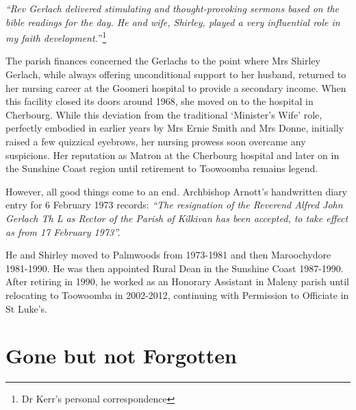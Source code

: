\emph{``Rev Gerlach delivered stimulating and thought-provoking sermons based on the bible readings for the day. He and wife, Shirley, played a very influential role in my faith development.}''\footnote{Dr Kerr's personal correspondence}


The parish finances concerned the Gerlachs to the point where Mrs Shirley Gerlach, while always offering unconditional support to her husband, returned to her nursing career at the Goomeri hospital to provide a secondary income. When this facility closed its doors around 1968, she moved on to the hospital in Cherbourg. While this deviation from the traditional `Minister's Wife' role, perfectly embodied in earlier years by Mrs Ernie Smith and Mrs Donne, initially raised a few quizzical eyebrows, her nursing prowess soon overcame any suspicions. Her reputation as Matron at the Cherbourg hospital and later on in the Sunshine Coast region until retirement to Toowoomba remains legend.



However, all good things come to an end. Archbishop Arnott's handwritten diary entry for 6 February 1973 records: \emph{``The resignation of the Reverend Alfred John Gerlach Th L as Rector of the Parish of Kilkivan has been accepted, to take effect as from 17 February 1973''.}



He and Shirley moved to Palmwoods from 1973-1981 and then Maroochydore 1981-1990. He was then appointed Rural Dean in the Sunshine Coast 1987-1990. After retiring in 1990, he worked as an Honorary Assistant in Maleny parish until relocating to Toowoomba in 2002-2012, continuing with Permission to Officiate in St Luke's.



\section{Gone but not Forgotten}



